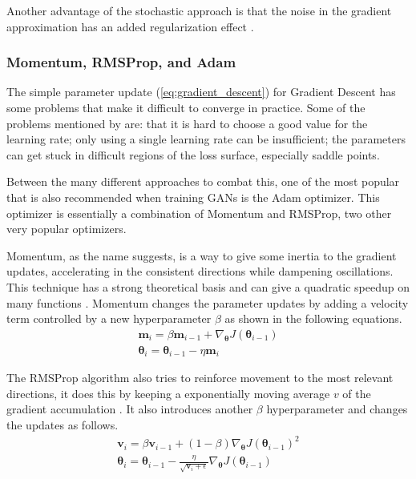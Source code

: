 Another advantage of the stochastic approach is that the noise in the gradient approximation has an added regularization effect \cite[p. 5]{practical_gradient_recomendations2012}.

\subsubsection{Momentum, RMSProp, and Adam}
The simple parameter update (\autoref{eq:gradient_descent}) for Gradient Descent has some problems that make it difficult to converge in practice. Some of the problems mentioned by \textcite{optimizers2016} are: that it is hard to choose a good value for the learning rate; only using a single learning rate can be insufficient; the parameters can get stuck in difficult regions of the loss surface, especially saddle points.

Between the many different approaches to combat this, one of the most popular that is also recommended when training \acp{GAN} \cite[p. 20, 27]{nipsGAN2017} is the \gls{Adam} optimizer. This optimizer is essentially a combination of Momentum and RMSProp, two other very popular optimizers.

Momentum, as the name suggests, is a way to give some inertia to the gradient updates, accelerating in the consistent directions while dampening oscillations. This technique has a strong theoretical basis and can give a quadratic speedup on many functions \cite{momentumWorks2017}. Momentum changes the parameter updates by adding a velocity term controlled by a new hyperparameter $\beta$ as shown in the following equations.
\begin{gather} \label{eq:momentum}
    \bm{m}_{i} = \beta \bm{m}_{i-1} + \nabla_{\bm{\theta}} J(\bm{\theta}_{i-1}) \\
    \bm{\theta}_{i} = \bm{\theta}_{i-1} - \eta \bm{m}_{i}
\end{gather}

The RMSProp algorithm also tries to reinforce movement to the most relevant directions, it does this by keeping a exponentially moving average $v$ of the gradient accumulation \cite[303-304]{deepLearningBook2016}. It also introduces another $\beta$ hyperparameter and changes the updates as follows.
\begin{gather}
    \bm{v}_{i} = \beta \bm{v}_{i-1} + (1 - \beta)\nabla_{\bm{\theta}} J(\bm{\theta}_{i-1})^2 \\
    \bm{\theta}_{i} = \bm{\theta}_{i-1} - \frac{\eta}{\sqrt{\bm{v}_{i} + \epsilon}} \nabla_{\bm{\theta}} J(\bm{\theta}_{i-1})
\end{gather}

